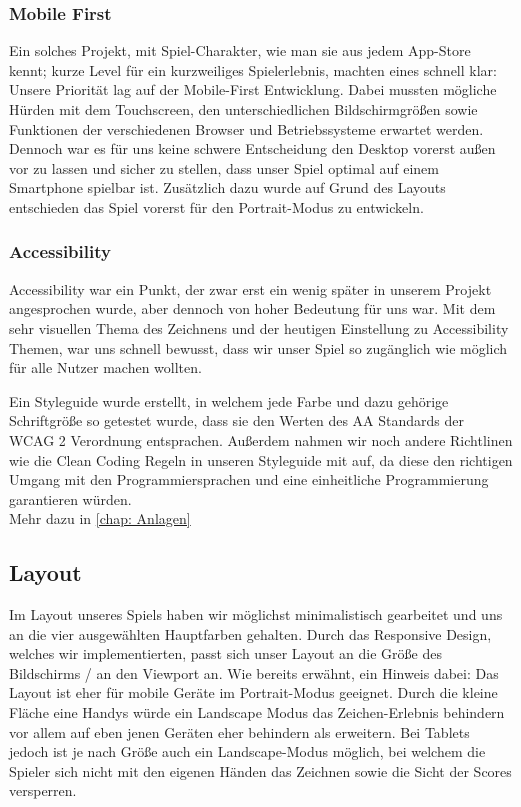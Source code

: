 \documentclass[11pt]{article}
\begin{document}
\subsubsection{Mobile First}

Ein solches Projekt, mit Spiel-Charakter, wie man sie aus jedem App-Store kennt; kurze Level für ein kurzweiliges Spielerlebnis, machten eines schnell klar: Unsere Priorität lag auf der Mobile-First Entwicklung.
Dabei mussten mögliche Hürden mit dem Touchscreen, den unterschiedlichen Bildschirmgrößen sowie Funktionen der verschiedenen Browser und Betriebssysteme erwartet werden. Dennoch war es für uns keine schwere Entscheidung den Desktop vorerst außen vor zu lassen und sicher zu stellen, dass unser Spiel optimal auf einem Smartphone spielbar ist. Zusätzlich dazu wurde auf Grund des Layouts entschieden das Spiel vorerst für den Portrait-Modus zu entwickeln. 

\subsubsection{Accessibility}

Accessibility war ein Punkt, der zwar erst ein wenig später in unserem Projekt angesprochen wurde, aber dennoch von hoher Bedeutung für uns war. Mit dem sehr visuellen Thema des Zeichnens und der heutigen Einstellung zu Accessibility Themen, war uns schnell bewusst, dass wir unser Spiel so zugänglich wie möglich für alle Nutzer machen wollten.

Ein Styleguide wurde erstellt, in welchem jede Farbe und dazu gehörige Schriftgröße so getestet wurde, dass sie den Werten des AA Standards der WCAG 2 Verordnung entsprachen. Außerdem nahmen wir noch andere Richtlinen wie die  Clean Coding Regeln in unseren Styleguide mit auf, da diese den richtigen Umgang mit den Programmiersprachen und eine einheitliche Programmierung garantieren würden.\\
Mehr dazu in \autoref{chap: Anlagen} 

\subsection{Layout}
Im Layout unseres Spiels haben wir möglichst minimalistisch gearbeitet und uns an die vier ausgewählten Hauptfarben gehalten. Durch das Responsive Design, welches wir implementierten, passt sich unser Layout an die Größe des Bildschirms / an den Viewport an. Wie bereits erwähnt, ein Hinweis dabei: Das Layout ist eher für mobile Geräte im Portrait-Modus geeignet. Durch die kleine Fläche eine Handys würde ein Landscape Modus das Zeichen-Erlebnis behindern vor allem auf eben jenen Geräten eher behindern als erweitern. Bei Tablets jedoch ist je nach Größe auch ein Landscape-Modus möglich, bei welchem die Spieler sich nicht mit den eigenen Händen das Zeichnen sowie die Sicht der Scores versperren.
\end{document}
